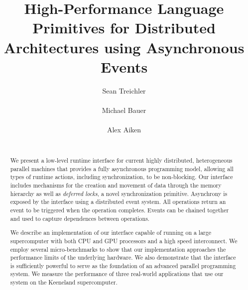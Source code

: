 \documentclass{sig-alternate}
\begin{document}
\title{High-Performance Language Primitives for Distributed Architectures using Asynchronous Events}
\author{
\alignauthor Sean Treichler\\
              \\
\alignauthor Michael Bauer \\
              \\
\alignauthor Alex Aiken \\
              \\
}
\maketitle

\begin{abstract}
We present a low-level runtime interface for current highly distributed, heterogeneous
parallel machines that provides a fully asynchronous 
programming model, allowing all types of runtime actions, including synchronization,
to be non-blocking.  Our interface includes mechanisms for the creation and movement
of data through the memory hierarchy as well as {\em deferred locks}, a novel synchronization primitive.
Asynchrony is exposed by the interface using a distributed event system.  All
operations return an event to be triggered when the operation completes.  Events
can be chained together and used to capture dependences between operations.

We describe an implementation of our interface capable of running on
a large supercomputer with both CPU and GPU processors and a high speed interconnect.
We employ several micro-benchmarks to show that our implementation approaches
the performance limits of the underlying hardware.
We also demonstrate that the interface is sufficiently powerful to serve as the foundation 
of an advanced parallel programming system.  We measure the performance of three real-world applications
that use our system on the Keeneland supercomputer.
\end{abstract}

%









{
\small


}
\end{document}
